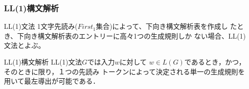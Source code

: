 \documentclass[dvipdfmx]{beamer}
\begin{document}
\begin{frame}
  \frametitle{LL(1)構文解析}





  \begin{itembox}[l]{LL(1)文法}
    1文字先読み($First_1$集合)によって、下向き構文解析表を作成し
    たとき、下向き構文解析表のエントリーに高々1つの生成規則しか
    ない場合、LL(1)文法とよぶ。
  \end{itembox}

  \begin{itembox}[l]{LL(1)構文解析}
    LL(1)文法$G$では入力$w$に対して
    $w\in L(G)$であるとき，かつ，そのときに限り，１つの先読み
    トークンによって決定される単一の生成規則を用いて最左導出が可能である．
  \end{itembox}




  \begin{list}{}{}
    \item {}\\
  \end{list}
\end{frame}
\end{document}
